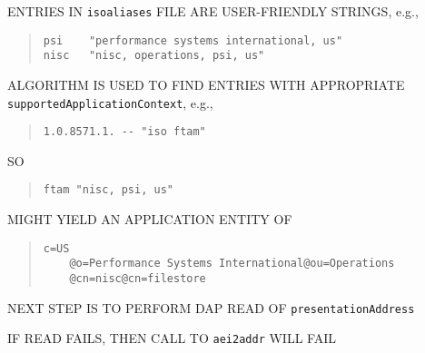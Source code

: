 \begin{bwslide}

\begin{nrtc}
\item	ENTRIES IN \verb"isoaliases" FILE ARE USER-FRIENDLY STRINGS,
	e.g.,
\begin{quote}\small\begin{verbatim}
psi    "performance systems international, us"
nisc   "nisc, operations, psi, us"
\end{verbatim}\end{quote}

\item	ALGORITHM IS USED TO FIND ENTRIES WITH APPROPRIATE
	\verb"supportedApplicationContext", e.g.,
\begin{quote}\small\begin{verbatim}
1.0.8571.1. -- "iso ftam"
\end{verbatim}\end{quote}
	SO
\begin{quote}\small\begin{verbatim}
ftam "nisc, psi, us"
\end{verbatim}\end{quote}
	MIGHT YIELD AN APPLICATION ENTITY OF
\begin{quote}\smaller\begin{verbatim}
c=US
    @o=Performance Systems International@ou=Operations
    @cn=nisc@cn=filestore
\end{verbatim}\end{quote}

\item	NEXT STEP IS TO PERFORM DAP READ OF \verb"presentationAddress"

\item	IF READ FAILS, THEN CALL TO \verb"aei2addr" WILL FAIL
\end{nrtc}
\end{bwslide}




